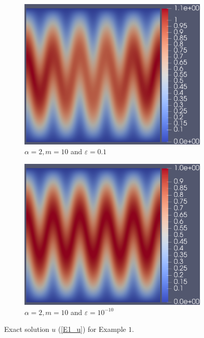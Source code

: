 \documentclass[12pt]{ociamthesis}
\begin{document}
\begin{figure}[H]
\begin{subfigure}{0.5\textwidth}
     \includegraphics[width=\textwidth]{Pics/uf/U_E1c_eps_1.png}
     \caption{$\alpha=2, m=10$ and $\varepsilon = 0.1$}
 \end{subfigure}
 \hfill
 \begin{subfigure}{0.5\textwidth}
     \includegraphics[width=\textwidth]{Pics/uf/u_E1c_eps_10.png}
     \caption{$\alpha=2, m=10$ and $\varepsilon = 10^{-10}$}
 \end{subfigure}
 \caption{Exact solution $u$ (\ref{E1_u}) for Example $1$.} \label{E1_us}
\end{figure}
\end{document}
